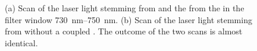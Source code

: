 		\begin{figure}[!htb]
			\begin{subfigure}[t]{ 0.49\linewidth}
				\centering
				\caption{}
				\label{subfig::vcsel_excitation_with_diamond}
			\end{subfigure}
			\hfill
			\begin{subfigure}[t]{ 0.49\linewidth}
				\centering
				\caption{}
				\label{subfig::vcsel_excitation_without_diamond}
			\end{subfigure}
			\caption[Comparison of intensities between \BmFour and \BmTwo]{(a) Scan of the laser light stemming from \BmFour and the \fl from the \siv in the filter window \SIrange{730}{750}{nm}. (b) Scan of the laser light stemming from \BmTwo without a coupled \siv. The outcome of the two scans is almost identical.}
			\label{fig::vcsel_excitation}
		\end{figure}


